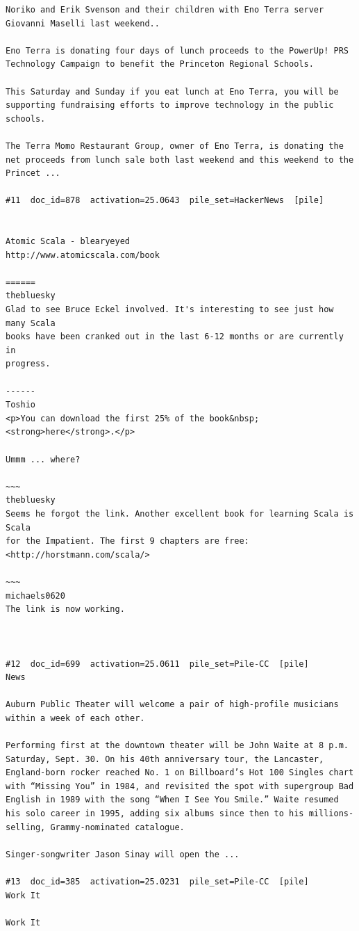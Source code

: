 \begin{verbatim}
Noriko and Erik Svenson and their children with Eno Terra server Giovanni Maselli last weekend..

Eno Terra is donating four days of lunch proceeds to the PowerUp! PRS Technology Campaign to benefit the Princeton Regional Schools.

This Saturday and Sunday if you eat lunch at Eno Terra, you will be supporting fundraising efforts to improve technology in the public schools.

The Terra Momo Restaurant Group, owner of Eno Terra, is donating the net proceeds from lunch sale both last weekend and this weekend to the Princet ...

#11  doc_id=878  activation=25.0643  pile_set=HackerNews  [pile]


Atomic Scala - blearyeyed
http://www.atomicscala.com/book

======
thebluesky
Glad to see Bruce Eckel involved. It's interesting to see just how many Scala
books have been cranked out in the last 6-12 months or are currently in
progress.

------
Toshio
<p>You can download the first 25% of the book&nbsp;<strong>here</strong>.</p>

Ummm ... where?

~~~
thebluesky
Seems he forgot the link. Another excellent book for learning Scala is Scala
for the Impatient. The first 9 chapters are free:
<http://horstmann.com/scala/>

~~~
michaels0620
The link is now working.



#12  doc_id=699  activation=25.0611  pile_set=Pile-CC  [pile]
News

Auburn Public Theater will welcome a pair of high-profile musicians within a week of each other.

Performing first at the downtown theater will be John Waite at 8 p.m. Saturday, Sept. 30. On his 40th anniversary tour, the Lancaster, England-born rocker reached No. 1 on Billboard’s Hot 100 Singles chart with “Missing You” in 1984, and revisited the spot with supergroup Bad English in 1989 with the song “When I See You Smile.” Waite resumed his solo career in 1995, adding six albums since then to his millions-selling, Grammy-nominated catalogue.

Singer-songwriter Jason Sinay will open the ...

#13  doc_id=385  activation=25.0231  pile_set=Pile-CC  [pile]
Work It

Work It


\end{verbatim}
